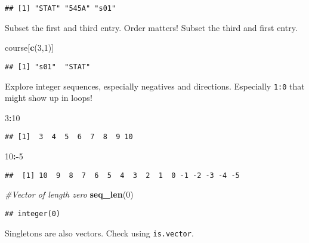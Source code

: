 \documentclass[]{article}
\newenvironment{Shaded}{\begin{snugshade}}{\end{snugshade}}
\newcommand{\KeywordTok}[1]{\textcolor[rgb]{0.13,0.29,0.53}{\textbf{#1}}}
\newcommand{\DecValTok}[1]{\textcolor[rgb]{0.00,0.00,0.81}{#1}}
\newcommand{\CommentTok}[1]{\textcolor[rgb]{0.56,0.35,0.01}{\textit{#1}}}
\newcommand{\OperatorTok}[1]{\textcolor[rgb]{0.81,0.36,0.00}{\textbf{#1}}}
\newcommand{\NormalTok}[1]{#1}
\begin{document}
\begin{verbatim}
## [1] "STAT" "545A" "s01"
\end{verbatim}

Subset the first and third entry. Order matters! Subset the third and
first entry.

\begin{Shaded}
\begin{Highlighting}[]
\NormalTok{course[}\KeywordTok{c}\NormalTok{(}\DecValTok{3}\NormalTok{,}\DecValTok{1}\NormalTok{)]}
\end{Highlighting}
\end{Shaded}

\begin{verbatim}
## [1] "s01"  "STAT"
\end{verbatim}

Explore integer sequences, especially negatives and directions.
Especially \texttt{1:0} that might show up in loops!

\begin{Shaded}
\begin{Highlighting}[]
\DecValTok{3}\OperatorTok{:}\DecValTok{10}
\end{Highlighting}
\end{Shaded}

\begin{verbatim}
## [1]  3  4  5  6  7  8  9 10
\end{verbatim}

\begin{Shaded}
\begin{Highlighting}[]
\DecValTok{10}\OperatorTok{:-}\DecValTok{5}
\end{Highlighting}
\end{Shaded}

\begin{verbatim}
##  [1] 10  9  8  7  6  5  4  3  2  1  0 -1 -2 -3 -4 -5
\end{verbatim}

\begin{Shaded}
\begin{Highlighting}[]
\CommentTok{#Vector of length zero}
\KeywordTok{seq_len}\NormalTok{(}\DecValTok{0}\NormalTok{)}
\end{Highlighting}
\end{Shaded}

\begin{verbatim}
## integer(0)
\end{verbatim}

Singletons are also vectors. Check using \texttt{is.vector}.
\end{document}
